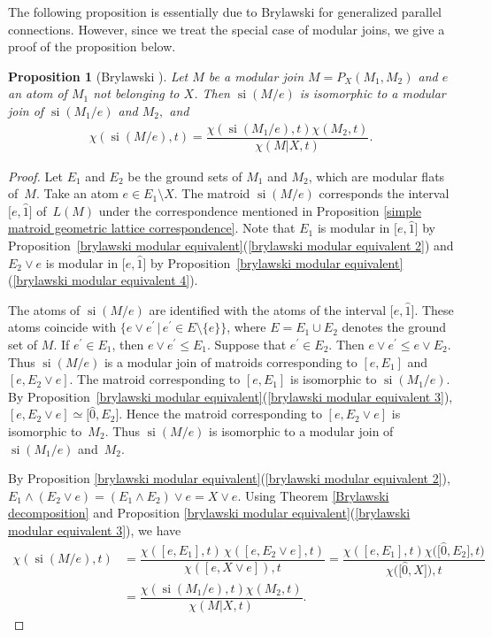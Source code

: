 \documentclass[11pt]{article}
\newtheorem{Proposition}[Theorem]{Proposition}
 { \theoremstyle{definition}
\newtheorem{Definition}[Theorem]{Definition}
\newtheorem{Example}[Theorem]{Example}
\newtheorem{Remark}[Theorem]{Remark}
\newtheorem{Question}[Theorem]{Question} }
\DeclareMathOperator{\si}{si}
\begin{document}
The following proposition is essentially due to Brylawski for generalized parallel connections.
However, since we treat the special case of modular joins, we give a proof of the proposition below.
\begin{Proposition}[Brylawski {\cite[Theorem 5.11.4]{brylawski1975modular-totams}}]\label{Brylawski contraction}
Let $ M $ be a modular join $ M=P_{X}(M_{1},M_{2}) $ and $ e $ an atom of $ M_{1} $ not belonging to $ X $.
Then $ \si(M/e) $ is isomorphic to a modular join of $ \si(M_{1}/e) $ and $ M_{2}, $ and
\begin{align*}
\chi(\si(M/e),t) = \dfrac{\chi(\si(M_{1}/e),t) \chi(M_{2}, t)}{\chi(M|X, t)}.
\end{align*}
\end{Proposition}
\begin{proof}
Let $ E_{1} $ and $ E_{2} $ be the ground sets of $ M_{1} $ and $ M_{2} $, which are modular flats of~$ M $.
Take an atom $ e \in E_{1} \setminus X $.
The matroid $ \si(M/e) $ corresponds the interval $ \big[e, \hat{1}\big] $ of~$ L(M) $ under the correspondence mentioned in Proposition \ref{simple matroid geometric lattice correspondence}.
Note that $ E_{1} $ is modular in $ \big[e, \hat{1}\big] $ by Proposition~\ref{brylawski modular equivalent}(\ref{brylawski modular equivalent 2}) and $ E_{2} \vee e $ is modular in $ \big[e, \hat{1}\big] $ by Proposition~\ref{brylawski modular equivalent}(\ref{brylawski modular equivalent 4}).

The atoms of $ \si(M/e) $ are identified with the atoms of the interval $ \big[e, \hat{1}\big] $.
These atoms coincide with $ \{ e \vee e^{\prime} \,|\, e^{\prime} \in E\setminus \{e\} \} $, where $ E = E_{1} \cup E_{2} $ denotes the ground set of $ M $.
If $ e^{\prime} \in E_{1} $, then $ e \vee e^{\prime} \leq E_{1} $.
Suppose that $ e^{\prime} \in E_{2} $.
Then $ e \vee e^{\prime} \leq e \vee E_{2} $.
Thus $ \si(M/e) $ is a modular join of matroids corresponding to $ [e, E_{1}] $ and $ [e, E_{2} \vee e] $.
The matroid corresponding to $ [e, E_{1}] $ is isomorphic to $ \si(M_{1}/e) $.
By Proposition~\ref{brylawski modular equivalent}(\ref{brylawski modular equivalent 3}), $ [e, E_{2} \vee e] \simeq \big[\hat{0}, E_{2}\big] $. Hence the matroid corresponding to $ [e, E_{2} \vee e] $ is isomorphic to~$ M_{2} $.
Thus $ \si(M/e) $ is isomorphic to a modular join of $ \si(M_{1}/e) $ and~$ M_{2} $.

By Proposition \ref{brylawski modular equivalent}(\ref{brylawski modular equivalent 2}), $ E_{1} \wedge (E_{2} \vee e) = (E_{1} \wedge E_{2}) \vee e = X \vee e $.
Using Theorem \ref{Brylawski decomposition} and Proposition \ref{brylawski modular equivalent}(\ref{brylawski modular equivalent 3}), we have
\begin{align*}
\chi(\si(M/e),t)& = \dfrac{\chi([e, E_{1}],t) \, \chi([e, E_{2}\vee e], t)}{\chi([e,X \vee e]), t}
= \dfrac{\chi([e, E_{1}],t) \chi\big(\big[\hat{0}, E_{2}\big], t\big)}{\chi\big(\big[\hat{0},X\big]\big), t} \\
&= \dfrac{\chi(\si(M_{1}/e),t) \chi(M_{2}, t)}{\chi(M|X, t)}.\tag*{\qed}
\end{align*}\renewcommand{\qed}{}
\end{proof}
\end{document}
